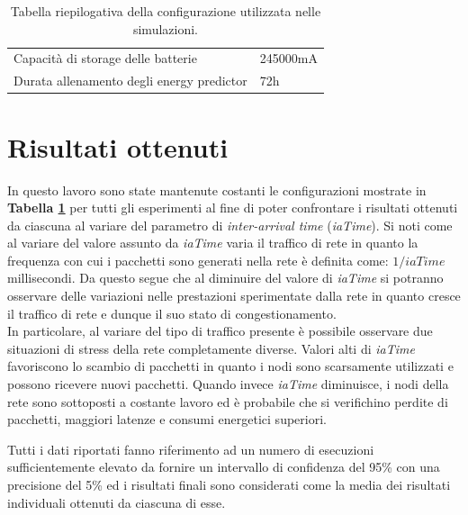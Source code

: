 \documentclass[binding=0.6cm,TFA]{sapthesis}
\begin{document}
\begin{table}[h]
\begin{tabular}{ |p{8cm}|p{4cm}|  }
        Capacità di storage delle batterie              & 245000mA                                  \\
        Durata allenamento degli energy predictor       & 72h                                       \\
        \hline
    \end{tabular}
    \centering
    \vspace*{5mm}
    \caption{Tabella riepilogativa della configurazione utilizzata nelle simulazioni.}
    \label{configs}
\end{table}

\section{Risultati ottenuti}

In questo lavoro sono state mantenute costanti le configurazioni mostrate in \textbf{Tabella \ref{configs}} per tutti gli esperimenti al fine di poter
confrontare i risultati ottenuti da ciascuna al variare del parametro di \emph{inter-arrival time} (\emph{iaTime}). Si noti come al variare del valore assunto
da \emph{iaTime} varia il traffico di rete in quanto la frequenza con cui i pacchetti sono generati nella rete è definita come: $1/iaTime$ millisecondi.
Da questo segue che al diminuire del valore di \emph{iaTime} si potranno osservare delle variazioni nelle prestazioni sperimentate dalla rete in quanto
cresce il traffico di rete e dunque il suo stato di congestionamento.\\

In particolare, al variare del tipo di traffico presente è possibile osservare due situazioni di stress della rete completamente diverse. Valori alti di \emph{iaTime}
favoriscono lo scambio di pacchetti in quanto i nodi sono scarsamente utilizzati e possono ricevere nuovi pacchetti. Quando invece \emph{iaTime} diminuisce, i
nodi della rete sono sottoposti a costante lavoro ed è probabile che si verifichino perdite di pacchetti, maggiori latenze e consumi energetici superiori.

\newpage

Tutti i dati riportati fanno riferimento ad un numero di esecuzioni sufficientemente elevato da fornire un intervallo di confidenza del 95\% con una precisione
del 5\% ed i risultati finali sono considerati come la media dei risultati individuali ottenuti da ciascuna di esse.\\
\end{document}
